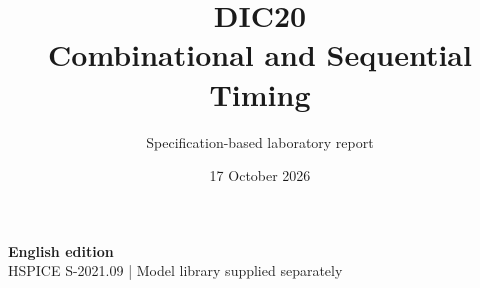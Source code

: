 \documentclass[11pt,a4paper]{article}
\title{\color{accent}DIC20\\[4pt]Combinational and Sequential Timing}
\author{Specification-based laboratory report}
\date{17 October 2026}
\begin{document}
\maketitle
\begin{center}\small\textbf{English edition}\\
HSPICE S-2021.09 \quad | \quad Model library supplied separately
\end{center}


\end{document}
